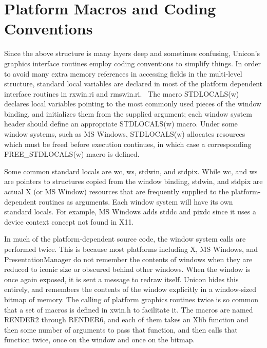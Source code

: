 \section{Platform Macros and Coding Conventions}

Since the above structure is many layers deep and sometimes confusing,
Unicon's graphics interface routines employ coding conventions to
simplify things. In order to avoid many extra memory references in
accessing fields in the multi-level structure,
{\textquotedbl}standard{\textquotedbl} local variables are declared in
most of the platform dependent interface routines in \textsf{rxwin.ri}
and \textsf{rmswin.ri}. \ The macro \textsf{STDLOCALS(w)} declares
local variables pointing to the most commonly used pieces of the
window binding, and initializes them from the supplied argument; each
window system header should define an appropriate
\textsf{STDLOCALS(w)} macro. Under some window systems, such as MS
Windows, \textsf{STDLOCALS(w)} allocates resources which must be freed
before execution continues, in which case a corresponding
\textsf{FREE\_STDLOCALS(w)} macro is defined.

Some common standard locals are \textsf{wc}, \textsf{ws},
\textsf{stdwin}, and \textsf{stdpix}. While \textsf{wc}, and
\textsf{ws} are pointers to structures copied from the window binding,
\textsf{stdwin}, and \textsf{stdpix} are actual X (or MS Window)
resources that are frequently supplied to the platform-dependent
routines as arguments. Each window system will have its own standard
locals. For example, MS Windows adds \textsf{stddc} and \textsf{pixdc}
since it uses a device context concept not found in X11.

In much of the platform-dependent source code, the window system calls
are performed twice. This is because most platforms including X, MS
Windows, and PresentationManager do not remember the contents of
windows when they are reduced to iconic size or obscured behind other
windows. When the window is once again exposed, it is sent a message
to redraw itself. Unicon hides this entirely, and remembers the
contents of the window explicitly in a window-sized bitmap of
memory. The calling of platform graphics routines twice is so common
that a set of macros is defined in \textsf{xwin.h} to facilitate it.
The macros are named \textsf{RENDER2} through \textsf{RENDER6}, and
each of them takes an Xlib function and then some number of arguments
to pass that function, and then calls that function twice, once on the
window and once on the bitmap.

